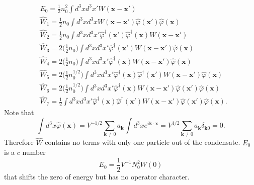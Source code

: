 \documentclass[12pt]{article}
\begin{document}
\begin{align}
    &E_0=\frac{1}{2}n_0^2\int d^3xd^3x'W(\mathbf{x}-\mathbf{x}')\label{W0}\\
    &\hat{W}_{1}=\frac{1}{2}n_{0}\int d^{3}xd^{3}xW(\mathbf{x}-\mathbf{x}')
    \hat{\varphi}(\mathbf{x}')\hat{\varphi}(\mathbf{x})\label{W1}\\
    &\hat{W}_{2}=\frac{1}{2}n_{0}\int d^{3}xd^{3}x'\hat{\varphi}^\dagger(\mathbf{x}')
    \hat{\varphi}^\dagger(\mathbf{x})W(\mathbf{x}-\mathbf{x}')\\
    &\hat{W}_{3}=2\Big(\frac{1}{2}n_{0}\Big)\int d^{3}xd^{3}x'\hat{\varphi}^\dagger
    (\mathbf{x}')W(\mathbf{x}-\mathbf{x}')\hat{\varphi}(\mathbf{x})\\
    &\hat{W}_{4}=2\Big(\frac{1}{2}n_{0}\Big)\int d^{3}xd^{3}x'\hat{\varphi}^\dagger
    (\mathbf{x})W(\mathbf{x}-\mathbf{x}')\hat{\varphi}(\mathbf{x})\\
    &\hat{W}_{5}=2\Big(\frac{1}{2}n^{1/2}_{0}\Big)\int d^{3}xd^{3}x'\hat{\varphi}^\dagger
    (\mathbf{x})\hat{\varphi}^\dagger(\mathbf{x}')W(\mathbf{x}-\mathbf{x}')\hat{\varphi}(\mathbf{x})\\
    &\hat{W}_{6}=2\Big(\frac{1}{2}n^{1/2}_{0}\Big)\int d^{3}xd^{3}x'\hat{\varphi}^\dagger
    (\mathbf{x})W(\mathbf{x}-\mathbf{x}')\hat{\varphi}(\mathbf{x}')\hat{\varphi}(\mathbf{x})\\
    &\hat{W}_{7}=\frac{1}{2}\int d^{3}xd^{3}x'\hat{\varphi}^\dagger(\mathbf{x})
    \hat{\varphi}^\dagger(\mathbf{x}')W(\mathbf{x}-\mathbf{x}')\hat{\varphi}
    (\mathbf{x}')\hat{\varphi}(\mathbf{x})\label{W7}.
\end{align}
Note that
\begin{equation}
    \int d^{3}x\hat{\varphi}(\mathbf{x})=V^{-1/2}\sum_{\mathbf{k}\neq 0}a_{\mathbf{k}}
    \int d^{3}xe^{i\mathbf{k}\cdot\mathbf{x}}=V^{1/2}\sum_{\mathbf{k}\neq 0}
    a_{\mathbf{k}} \delta_{\mathbf{k} 0}=0.
\end{equation}
Therefore $\hat{W}$ contains no terms with only one particle out of the condensate.
$E_0$ is a $c$ number 
\begin{equation}
    E_0=\frac{1}{2}V^{-1}N_0^2W(0)
\end{equation}
that shifts the zero of energy but has no operator character.
\end{document}

